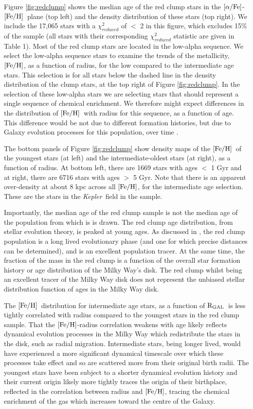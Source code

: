 \documentclass[12pt, preprint]{aastex}
\newcommand{\project}[1]{\textsl{#1}}
\newcommand{\kepler}{\project{Kepler}}
\newcommand{\feh}{\mbox{$\rm [Fe/H]$}}
\newcommand{\alphafe}{\mbox{$\rm [\alpha/Fe]$}}
\newcommand{\rgal}{\mbox{$\rm R_{GAL}$}}
\begin{document}
Figure \ref{fig:redclump} shows the median age of the red clump stars in the \alphafe-\feh\ plane (top left) and the density distribution of these stars (top right). We include the 17,065 stars with a $\chi_{reduced}^2$ of $<$ 2 in this figure, which excludes 15\% of the sample (all stars with their corresponding $\chi_{reduced}^2$ statistic are given in Table 1). Most of the red clump stars are located in the low-alpha sequence. We select the low-alpha sequence stars to examine the trends of the metallicity, \feh, as a function of radius, for the low compared to the intermediate age stars. This selection is for all stars below the dashed line in the density distribution of the clump stars, at the top right of Figure \ref{fig:redclump}. In the selection of these low-alpha stars we are selecting stars that should represent a single sequence of chemical enrichment. We therefore might expect differences in the distribution of \feh\ with radius for this sequence, as a function of age. This difference would be not due to different formation histories, but due to Galaxy evolution processes for this population, over time \citep[e.g.][]{Roskar2008, Schonrich2009}. 

The bottom panels of Figure \ref{fig:redclump} show density maps of the \feh\ of the youngest stars (at left) and the intermediate-oldest stars (at right), as a function of radius. At bottom left, there are 1669 stars with ages $<$ 1 Gyr and at right, there are 6716 stars with ages $>$ 5 Gyr. Note that there is an apparent over-density at about 8 kpc across all \feh, for the intermediate age selection. These are the stars in the \kepler\ field in the sample.

Importantly, the median age of the red clump sample is not the median age of the population from which is is drawn. The red clump age distribution, from stellar evolution theory, is peaked at young ages. As discussed in \citet{Bovy2014}, the red clump population is a long lived evolutionary phase (and one for which precise distances can be determined), and is an excellent population tracer. At the same time, the fraction of the mass in the red clump is a function of the overall star formation history or age distribution of the Milky Way's disk.  The red clump whilst being an excellent tracer of the Milky Way disk does not represent the unbiased stellar distribution function of ages in the Milky Way disk. 

The \feh\ distribution for intermediate age stars, as a function of \rgal\ is less tightly correlated with radius compared to the youngest stars in the red clump sample. That the \feh-radius correlation weakens with age likely reflects dynamical evolution processes in the Milky Way which redistribute the stars in the disk, such as radial migration. Intermediate stars, being longer lived, would have experienced a more significant dynamical timescale over which these processes take effect and so are scattered more from their original birth radii.  The youngest stars have been subject to a shorter dynamical evolution history and their current origin likely more tightly traces the origin of their birthplace, reflected in the correlation between radius and \feh, tracing the chemical enrichment of the gas which increases toward the centre of the Galaxy.  
\end{document}
